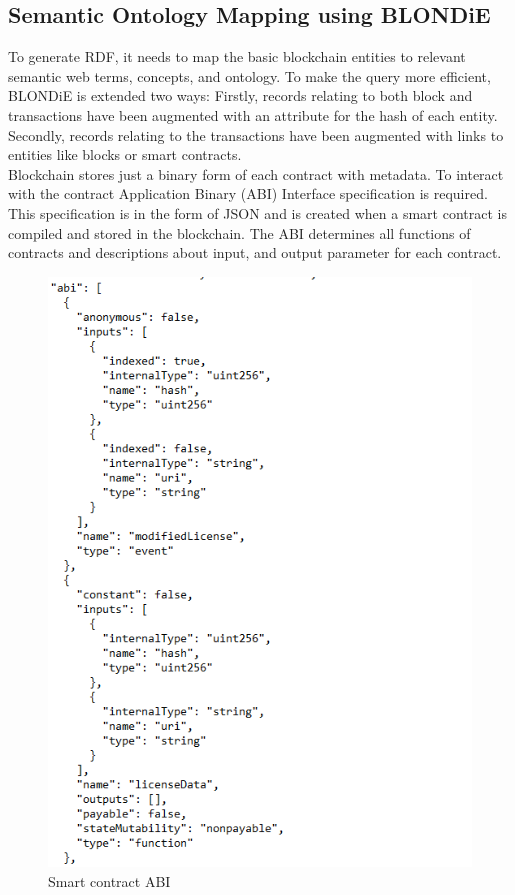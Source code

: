 \subsection{Semantic Ontology Mapping using BLONDiE} 
To generate RDF, it needs to map the basic blockchain entities to relevant semantic web terms, concepts, and ontology. To make the query more efficient, BLONDiE is extended two ways: Firstly, records relating to both block and transactions have been
augmented with an attribute for the hash of each entity. Secondly, records relating to the transactions have been augmented with links to entities like blocks or smart contracts.\\
Blockchain stores just a binary form of each contract with metadata.   
To interact with the contract Application Binary (ABI) Interface specification is required. This specification is in the form of JSON and is created when a smart contract is compiled and stored in the blockchain. The ABI determines all functions of contracts and descriptions about input, and output parameter for each contract\cite{Third}.

\begin{center}
	\begin{figure}[htb!]
		
		\begin{minipage}{0.45\linewidth}
			\centering
			\includegraphics[width=1.95\textwidth]{images/chap02_SmartContract_ABI.png}
		\end{minipage}
		\caption[Smart contract ABI]{Smart contract ABI}
		
	\end{figure}
	
\end{center}



